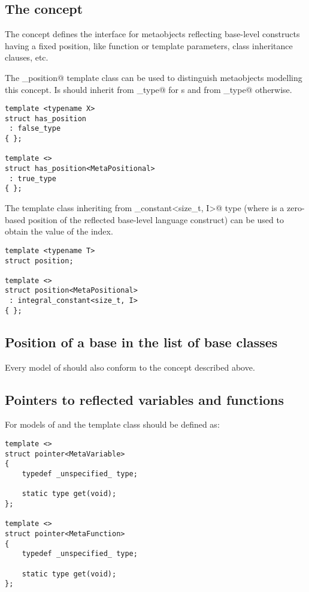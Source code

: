 \subsection{The  concept}

The  concept defines the interface for metaobjects reflecting
base-level constructs having a fixed position, like function or template parameters,
class inheritance clauses, etc.

The \verb@has_position@ template class can be used to distinguish metaobjects modelling
this concept. Is should inherit from \verb@true_type@ for s and from
\verb@false_type@ otherwise.

\begin{verbatim}
template <typename X>
struct has_position
 : false_type
{ };

template <>
struct has_position<MetaPositional>
 : true_type
{ };
\end{verbatim}

The \verb@position@ template class inheriting
from \verb@integral_constant<size_t, I>@ type (where \verb@I@ is
a zero-based position of the reflected base-level language construct)
can be used to obtain the value of the index.

\begin{verbatim}
template <typename T>
struct position;

template <>
struct position<MetaPositional>
 : integral_constant<size_t, I>
{ };
\end{verbatim}

\subsection{Position of a base in the list of base classes}

Every model of  should also conform to the 
concept described above.

\subsection{Pointers to reflected variables and functions}

For models of  and  the \verb@pointer@ template class
should be defined as:

\begin{verbatim}
template <>
struct pointer<MetaVariable>
{
	typedef _unspecified_ type;

	static type get(void);
};

template <>
struct pointer<MetaFunction>
{
	typedef _unspecified_ type;

	static type get(void);
};
\end{verbatim}

